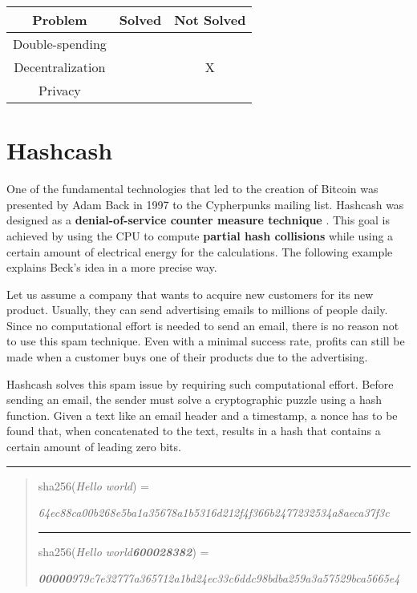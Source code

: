 \begin{center}
	\begin{tabular}{|c c c|} 
		\hline
		Problem & Solved & Not Solved \\ [0.5ex] 
		\hline
		Double-spending & \checkmark &  \\ [0.5ex]
		\hline
		Decentralization &  & X \\ [0.5ex]
		\hline
		Privacy & \checkmark &  \\ [0.5ex]
		\hline
	\end{tabular}
\end{center}

\section{Hashcash}
One of the fundamental technologies that led to the creation of Bitcoin was presented by Adam Back in 1997 \cite{back1997} to the Cypherpunks mailing list.
Hashcash was designed as a \textbf{denial-of-service counter measure technique} \cite{back2002}.
This goal is achieved by using the CPU to compute \textbf{partial hash collisions} while using a certain amount of electrical energy for the calculations.
The following example explains Beck's idea in a more precise way.

Let us assume a company that wants to acquire new customers for its new product.
Usually, they can send advertising emails to millions of people daily.
Since no computational effort is needed to send an email, there is no reason not to use this spam technique.
Even with a minimal success rate, profits can still be made when a customer buys one of their products due to the advertising.

Hashcash solves this spam issue by requiring such computational effort.
Before sending an email, the sender must solve a cryptographic puzzle using a hash function.
Given a text like an email header and a timestamp, a nonce has to be found that, when concatenated to the text, results in a hash that contains a certain amount of leading zero bits.

\vspace{4pt}
\hrule

\begin{center}
	\begin{quote}
		\centering 
		sha256(\textit{Hello world}) =
		
		\textit{64ec88ca00b268e5ba1a35678a1b5316d212f4f366b2477232534a8aeca37f3c}
		\hrule
		sha256(\textit{Hello world\textbf{600028382}}) =
		
		\textit{\textbf{00000}979c7e32777a365712a1bd24ec33c6ddc98bdba259a3a57529bca5665e4}
	\end{quote}
\end{center}


